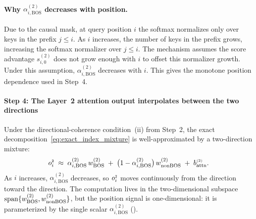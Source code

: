 \documentclass{article}
\theoremstyle{plain}
\theoremstyle{definition}
\theoremstyle{remark}
\begin{document}
\paragraph{Why $\alpha^{(2)}_{i,\mathrm{BOS}}$ decreases with position.}
Due to the causal mask, at query position $i$ the softmax normalizes only over keys in the prefix $j\le i$.
As $i$ increases, the number of \nbos keys in the prefix grows, increasing the softmax normalizer over $j\le i$.
The mechanism assumes the \bos score advantage $s_{i,0}^{(2)}$ does not grow enough with $i$ to offset this normalizer growth.
Under this assumption, $\alpha^{(2)}_{i,\mathrm{BOS}}$ decreases with $i$.
This gives the monotone position dependence used in Step~4.

\paragraph{Step 4: The Layer~2 attention output interpolates between the two directions}
\label{subsec:mech_step4}

Under the directional-coherence condition~(ii) from Step~2, the exact decomposition~\eqref{eq:exact_index_mixture} is well-approximated by a two-direction mixture:
\begin{equation}
o_{i}^{\scriptscriptstyle 2}
\;\approx\;
\alpha^{(2)}_{i,\mathrm{BOS}}\, w_{\text{BOS}}^{(2)}
\;+\;
\big(1-\alpha^{(2)}_{i,\mathrm{BOS}}\big)\, w_{\text{nonBOS}}^{(2)}
\;+\;
b_{\text{attn}}^{\scriptscriptstyle (2)}.
\label{eq:two_dir_mixture_mech}
\end{equation}
As $i$ increases, $\alpha^{(2)}_{i,\mathrm{BOS}}$ decreases, so $o_{i}^{\scriptscriptstyle 2}$ moves continuously from the \bos direction toward the
\nbos direction.
The computation lives in the two-dimensional subspace $\mathrm{span}\{w_{\text{BOS}}^{(2)},w_{\text{nonBOS}}^{(2)}\}$, but the position signal is one-dimensional: it is parameterized by the single scalar $\alpha^{(2)}_{i,\mathrm{BOS}}$ ().
\end{document}

